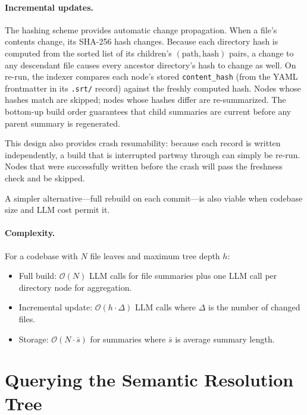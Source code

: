 \documentclass[11pt,a4paper]{article}
\newcommand{\bigO}{\mathcal{O}}
\begin{document}
\paragraph{Incremental updates.}
The hashing scheme provides automatic change propagation.
When a file's contents change, its SHA-256 hash changes.
Because each directory hash is computed from the sorted list of its children's $(\text{path}, \text{hash})$ pairs, a change to any descendant file causes every ancestor directory's hash to change as well.
On re-run, the indexer compares each node's stored \texttt{content\_hash} (from the YAML frontmatter in its \texttt{.srt/} record) against the freshly computed hash.
Nodes whose hashes match are skipped; nodes whose hashes differ are re-summarized.
The bottom-up build order guarantees that child summaries are current before any parent summary is regenerated.

This design also provides crash resumability: because each record is written independently, a build that is interrupted partway through can simply be re-run.
Nodes that were successfully written before the crash will pass the freshness check and be skipped.

A simpler alternative---full rebuild on each commit---is also viable when codebase size and LLM cost permit it.

\paragraph{Complexity.}
For a codebase with $N$ file leaves and maximum tree depth $h$:
\begin{itemize}[nosep]
    \item Full build: $\bigO(N)$ LLM calls for file summaries plus one LLM call per directory node for aggregation.
    \item Incremental update: $\bigO(h \cdot \Delta)$ LLM calls where $\Delta$ is the number of changed files.
    \item Storage: $\bigO(N \cdot \bar{s})$ for summaries where $\bar{s}$ is average summary length.
\end{itemize}


\section{Querying the Semantic Resolution Tree}\label{sec:querying}
\end{document}

